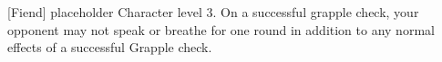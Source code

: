  {[Fiend]}
\shortdescfeat
{placeholder}
{Character level 3.}
{On a successful grapple check, your opponent may not speak or breathe for one round in addition to any normal effects of a successful Grapple check.}